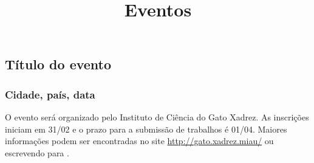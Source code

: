 %
% 
%
% 
% 
%
%

\title{Eventos}
\maketitle

\subsection{Título do evento}
\subsubsection{Cidade, país, data}

O evento será organizado pelo Instituto de Ciência do Gato Xadrez. As inscrições iniciam em 31/02 e o prazo para a submissão de trabalhos é 01/04. Maiores informações podem ser encontradas no site \url{http://gato.xadrez.miau/} ou escrevendo para .


